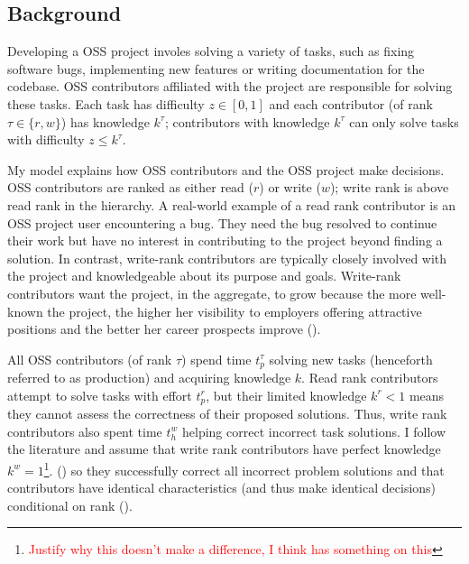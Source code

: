 \documentclass[source/paper/main.tex]{subfiles}
\begin{document}
\subsection{Background}
Developing a OSS project involes solving a variety of tasks, such as fixing software bugs, implementing new features or writing documentation for the codebase. OSS contributors affiliated with the project are responsible for solving these tasks. Each task has difficulty $z \in [0, 1]$ and each contributor (of rank $\tau \in \{r, w\}$) has knowledge $k^\tau$; contributors with knowledge $k^\tau$ can only solve tasks with difficulty $z \leq k^\tau$. 

\qquad My model explains how OSS contributors and the OSS project make decisions. OSS contributors are ranked as either read ($r$) or write ($w$);  write rank is above read rank in the hierarchy. A real-world example of a read rank contributor is an OSS project user encountering a bug. They need the bug resolved to continue their work but have no interest in contributing to the project beyond finding a solution. In contrast, write-rank contributors are typically closely involved with the project and knowledgeable about its purpose and goals. Write-rank contributors want the project, in the aggregate, to grow because the more well-known the project, the higher her visibility to employers offering attractive positions and the better her career prospects improve (\cite{hann_economic_2002}). 

\qquad  All OSS contributors (of rank $\tau$) spend time $t_p^\tau$ solving new tasks (henceforth referred to as production) and acquiring knowledge $k$. Read rank contributors attempt to solve tasks with effort $t_p^r$, but their limited knowledge $k^r < 1$ means they cannot assess the correctness of their proposed solutions. Thus, write rank contributors also spent time $t_h^w$ helping correct incorrect task solutions. I follow the literature and assume that write rank contributors have perfect knowledge $k^w = 1$\footnote{\textcolor{red}{Justify why this doesn't make a difference, I think \cite{garicano_hierarchies_2000} has something on this}}. (\cite{bloom_distinct_2014}) so they successfully correct all incorrect problem solutions and that contributors have identical characteristics (and thus make identical decisions) conditional on rank (\cite{garicano_hierarchies_2000}). 
\end{document}

